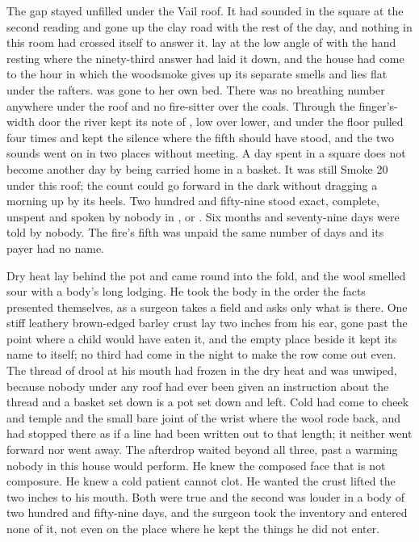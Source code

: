 The gap stayed unfilled under the Vail roof. It had sounded in the square at the second reading and gone up the clay road with the rest of the day, and nothing in this room had crossed itself to answer it.  lay at the low angle of  with the hand resting where the ninety-third answer had laid it down, and the house had come to the hour in which the woodsmoke gives up its separate smells and lies flat under the rafters.  was gone to her own bed. There was no breathing number anywhere under the roof and no fire-sitter over the coals. Through the finger's-width door the river kept its note of , low over lower, and under the floor  pulled four times and kept the silence where the fifth should have stood, and the two sounds went on in two places without meeting. A day spent in a square does not become another day by being carried home in a basket. It was still Smoke 20 under this roof; the count could go forward in the dark without dragging a morning up by its heels. Two hundred and fifty-nine stood exact, complete, unspent and spoken by nobody in ,  or . Six months and seventy-nine days were told by nobody. The fire's fifth was unpaid the same number of days and its payer had no name.

Dry heat lay behind the pot and came round into the fold, and the wool smelled sour with a body's long lodging. He took the body in the order the facts presented themselves, as a surgeon takes a field and asks only what is there. One stiff leathery brown-edged barley crust lay two inches from his ear, gone past the point where a child would have eaten it, and the empty place beside it kept its name to itself; no third had come in the night to make the row come out even. The thread of drool at his mouth had frozen in the dry heat and was unwiped, because nobody under any roof had ever been given an instruction about the thread and a basket set down is a pot set down and left. Cold had come to cheek and temple and the small bare joint of the wrist where the wool rode back, and had stopped there as if a line had been written out to that length; it neither went forward nor went away. The afterdrop waited beyond all three, past a warming nobody in this house would perform. He knew the composed face that is not composure. He knew a cold patient cannot clot. He wanted the crust lifted the two inches to his mouth. Both were true and the second was louder in a body of two hundred and fifty-nine days, and the surgeon took the inventory and entered none of it, not even on the place where he kept the things he did not enter.

